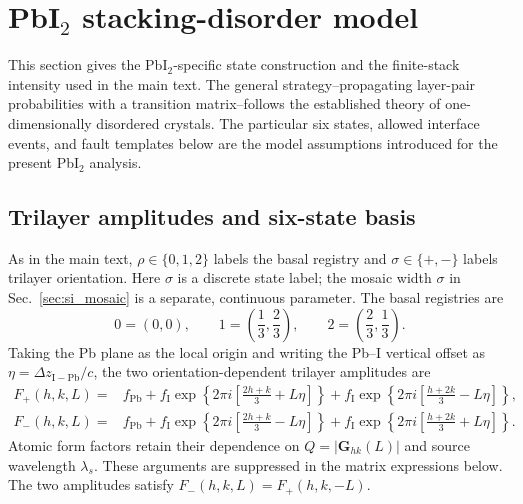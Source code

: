 \section{PbI\texorpdfstring{$_2$}{2} stacking-disorder model}
\label{sec:si_pbi2_transition}

This section gives the PbI$_2$-specific state construction and the finite-stack
intensity used in the main text.  The general strategy--propagating layer-pair
probabilities with a transition matrix--follows the established theory of
one-dimensionally disordered crystals.\cite{HendricksTeller1942,KakinokiKomura1954,KakinokiKomura1965,Hart2018}
The particular six states, allowed interface events, and fault templates below
are the model assumptions introduced for the present PbI$_2$ analysis.

\subsection{Trilayer amplitudes and six-state basis}

As in the main text, $\rho\in\{0,1,2\}$ labels the basal registry and $\sigma\in\{+,-\}$ labels trilayer orientation. Here $\sigma$ is a discrete state label; the mosaic width $\sigma$ in Sec.~\ref{sec:si_mosaic} is a separate, continuous parameter. The basal registries are
\begin{equation}
  0=(0,0),\qquad
  1=\left(\frac13,\frac23\right),\qquad
  2=\left(\frac23,\frac13\right).
  \label{eq:si_pbi2_registries}
\end{equation}
Taking the Pb plane as the local origin and writing the Pb--I vertical offset
as $\eta=\Delta z_{\mathrm{I-Pb}}/c$, the two orientation-dependent trilayer
amplitudes are
\begin{align}
 F_+(h,k,L)={}&f_{\mathrm{Pb}}+
 f_{\mathrm I}\exp\!\left\{2\pi i\left[\frac{2h+k}{3}+L\eta\right]\right\}
 +f_{\mathrm I}\exp\!\left\{2\pi i\left[\frac{h+2k}{3}-L\eta\right]\right\},
 \label{eq:si_pbi2_Fplus}\\
 F_-(h,k,L)={}&f_{\mathrm{Pb}}+
 f_{\mathrm I}\exp\!\left\{2\pi i\left[\frac{2h+k}{3}-L\eta\right]\right\}
 +f_{\mathrm I}\exp\!\left\{2\pi i\left[\frac{h+2k}{3}+L\eta\right]\right\}.
 \label{eq:si_pbi2_Fminus}
\end{align}
Atomic form factors retain their dependence on $Q=|\mathbf G_{hk}(L)|$ and source wavelength $\lambda_s$. These arguments are suppressed in the matrix expressions below.  The two amplitudes
satisfy $F_-(h,k,L)=F_+(h,k,-L)$.

